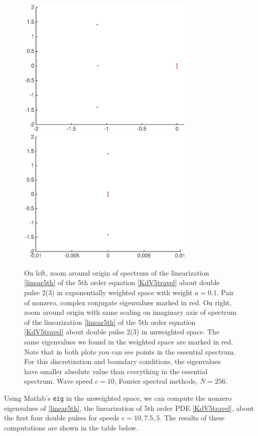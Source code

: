 \documentclass[12pt]{article}
\begin{document}
\begin{figure}[H]
	\includegraphics[width=8.5cm]{four10ud2_3redexpwt}
	\includegraphics[width=8.5cm]{four10ud2_3red}
	\caption{On left, zoom around origin of spectrum of the linearization \eqref{linear5th} of the 5th order equation \eqref{KdV5travel} about double pulse 2(3) in exponentially weighted space with weight $a = 0.1$. Pair of nonzero, complex conjugate eigenvalues marked in red. On right, zoom around origin with same scaling on imaginary axis of spectrum of the linearization \eqref{linear5th} of the 5th order equation \eqref{KdV5travel} about double pulse 2(3) in unweighted space. The same eigenvalues we found in the weighted space are marked in red. Note that in both plots you can see points in the essential spectrum. For this discretization and boundary conditions, the eigenvalues have smaller absolute value than everything in the essential spectrum. Wave speed $c = 10$, Fourier spectral methods, $N = 256$.}
\end{figure}

Using Matlab's \texttt{eig} in the unweighted space, we can compute the nonzero eigenvalues of \eqref{linear5th}, the linearization of 5th order PDE \eqref{KdV5travel}, about the first four double pulses for speeds $c = 10, 7.5, 5$. The results of these computations are shown in the table below.
\end{document}
